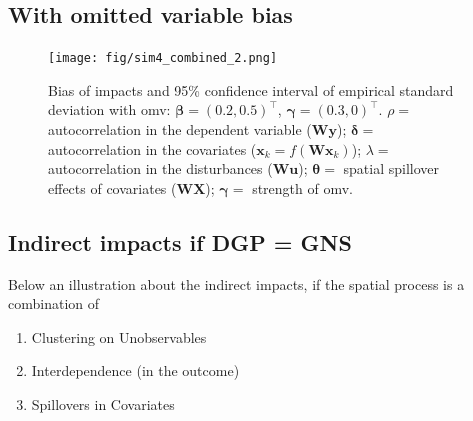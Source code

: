 \documentclass[
  letterpaper,
]{scrbook}
\begin{document}
\hypertarget{with-omitted-variable-bias}{%
\subsection{With omitted variable
bias}\label{with-omitted-variable-bias}}

\begin{figure}

{\centering \texttt{[image: fig/sim4\_combined\_2.png]}

}

\caption{Bias of impacts and 95\% confidence interval of empirical
standard deviation with omv:
\({\boldsymbol{\mathbf{\beta}}}=(0.2, 0.5)^\intercal\),
\({\boldsymbol{\mathbf{\gamma}}}=(0.3, 0)^\intercal\). \(\rho=\)
autocorrelation in the dependent variable
(\(\boldsymbol{\mathbf{W}} \boldsymbol{\mathbf{y}}\));
\(\boldsymbol{\mathbf{\delta}}=\) autocorrelation in the covariates
(\(\boldsymbol{\mathbf{x}}_k = f(\boldsymbol{\mathbf{W}} \boldsymbol{\mathbf{x}}_k)\));
\(\lambda=\) autocorrelation in the disturbances
(\(\boldsymbol{\mathbf{W}} \boldsymbol{\mathbf{u}}\));
\(\boldsymbol{\mathbf{\theta}}=\) spatial spillover effects of
covariates (\(\boldsymbol{\mathbf{W}} \boldsymbol{\mathbf{X}}\));
\(\boldsymbol{\mathbf{\gamma}}=\) strength of omv.}

\end{figure}

\hypertarget{indirect-impacts-if-dgp-gns}{%
\subsection{Indirect impacts if DGP =
GNS}\label{indirect-impacts-if-dgp-gns}}

Below an illustration about the indirect impacts, if the spatial process
is a combination of

\begin{enumerate}
\def\labelenumi{\arabic{enumi})}
\item
  Clustering on Unobservables
\item
  Interdependence (in the outcome)
\item
  Spillovers in Covariates
\end{enumerate}
\end{document}
